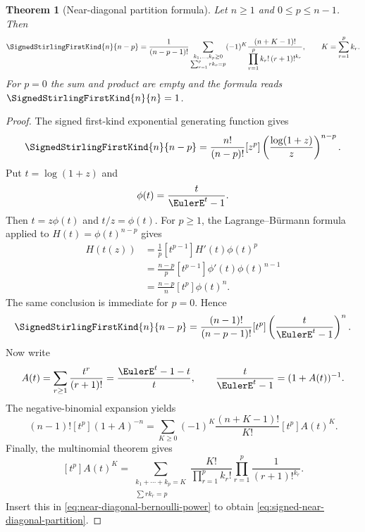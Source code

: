 \documentclass[11pt,a4paper,oneside,openany]{book}
\newtheorem{theorem}{Theorem}[chapter]
\theoremstyle{definition}
\theoremstyle{remark}
\begin{document}
\begin{theorem}[Near-diagonal partition formula]
\label{thm:signed-near-diagonal-partition}
Let $n\ge1$ and $0\le p\le n-1$.  Then
\begin{equation}
\label{eq:signed-near-diagonal-partition}
 \SignedStirlingFirstKind{n}{n-p}=\frac{1}{(n-p-1)!}
 \sum_{\substack{k_1,\ldots,k_p\ge0\\
                  \sum_{r=1}^{p}r k_r=p}}
 (-1)^K
 \frac{(n+K-1)!}
 {\displaystyle\prod_{r=1}^{p}k_r!\,(r+1)!^{k_r}},
 \qquad K=\sum_{r=1}^{p}k_r.
\end{equation}
For $p=0$ the sum and product are empty and the formula reads $\SignedStirlingFirstKind{n}{n}=1$.
\end{theorem}
\begin{proof}
The signed first-kind exponential generating function gives
\begin{equation}
\label{eq:near-diagonal-log-coefficient}
 \SignedStirlingFirstKind{n}{n-p}=\frac{n!}{(n-p)!}
 [z^p]\left(\frac{\log(1+z)}{z}\right)^{n-p}.
\end{equation}
Put $t=\log(1+z)$ and
\[
 \phi(t)=\frac{t}{\EulerE^t-1}.
\]
Then $t=z\phi(t)$ and $t/z=\phi(t)$.  For $p\ge1$, the
Lagrange--B\"urmann formula applied to $H(t)=\phi(t)^{n-p}$ gives
\begin{align*}
 [z^p]H(t(z))
 &=\frac1p[t^{p-1}]H'(t)\phi(t)^p\\
 &=\frac{n-p}{p}[t^{p-1}]\phi'(t)\phi(t)^{n-1}\\
 &=\frac{n-p}{n}[t^p]\phi(t)^n.
\end{align*}
The same conclusion is immediate for $p=0$.  Hence
\begin{equation}
\label{eq:near-diagonal-bernoulli-power}
 \SignedStirlingFirstKind{n}{n-p}=\frac{(n-1)!}{(n-p-1)!}
 [t^p]\left(\frac{t}{\EulerE^t-1}\right)^n.
\end{equation}
Now write
\[
 A(t)=\sum_{r\ge1}\frac{t^r}{(r+1)!}
     =\frac{\EulerE^t-1-t}{t},
 \qquad \frac{t}{\EulerE^t-1}=(1+A(t))^{-1}.
\]
The negative-binomial expansion yields
\[
 (n-1)![t^p](1+A)^{-n}
 =\sum_{K\ge0}(-1)^K\frac{(n+K-1)!}{K!}[t^p]A(t)^K.
\]
Finally, the multinomial theorem gives
\[
 [t^p]A(t)^K
 =\sum_{\substack{k_1+\cdots+k_p=K\\
                   \sum r k_r=p}}
   \frac{K!}{\prod_{r=1}^{p}k_r!}
   \prod_{r=1}^{p}\frac1{(r+1)!^{k_r}}.
\]
Insert this in \eqref{eq:near-diagonal-bernoulli-power} to obtain
\eqref{eq:signed-near-diagonal-partition}.
\end{proof}
\end{document}
